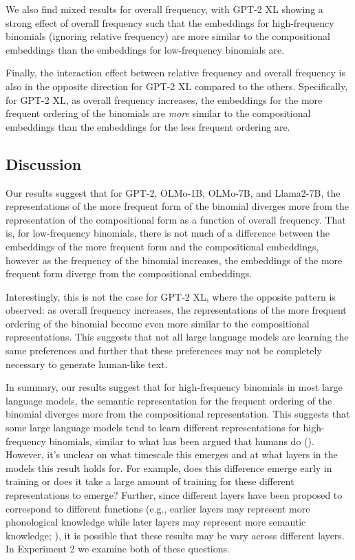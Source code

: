 \documentclass[
  12pt,
  letterpaper,
]{scrreport}
\begin{document}
We also find mixed results for overall frequency, with GPT-2 XL showing
a strong effect of overall frequency such that the embeddings for
high-frequency binomials (ignoring relative frequency) are more similar
to the compositional embeddings than the embeddings for low-frequency
binomials are.

Finally, the interaction effect between relative frequency and overall
frequency is also in the opposite direction for GPT-2 XL compared to the
others. Specifically, for GPT-2 XL, as overall frequency increases, the
embeddings for the more frequent ordering of the binomials are
\emph{more} similar to the compositional embeddings than the embeddings
for the less frequent ordering are.

\subsection{Discussion}\label{discussion-8}

Our results suggest that for GPT-2, OLMo-1B, OLMo-7B, and Llama2-7B, the
representations of the more frequent form of the binomial diverges more
from the representation of the compositional form as a function of
overall frequency. That is, for low-frequency binomials, there is not
much of a difference between the embeddings of the more frequent form
and the compositional embeddings, however as the frequency of the
binomial increases, the embeddings of the more frequent form diverge
from the compositional embeddings.

Interestingly, this is not the case for GPT-2 XL, where the opposite
pattern is observed: as overall frequency increases, the representations
of the more frequent ordering of the binomial become even more similar
to the compositional representations. This suggests that not all large
language models are learning the same preferences and further that these
preferences may not be completely necessary to generate human-like text.

In summary, our results suggest that for high-frequency binomials in
most large language models, the semantic representation for the frequent
ordering of the binomial diverges more from the compositional
representation. This suggests that some large language models tend to
learn different representations for high-frequency binomials, similar to
what has been argued that humans do
(). However, it's unclear on what timescale this emerges and at
what layers in the models this result holds for. For example, does this
difference emerge early in training or does it take a large amount of
training for these different representations to emerge? Further, since
different layers have been proposed to correspond to different functions
(e.g., earlier layers may represent more phonological knowledge while
later layers may represent more semantic knowledge;
),
it is possible that these results may be vary across different layers.
In Experiment 2 we examine both of these questions.
\end{document}
